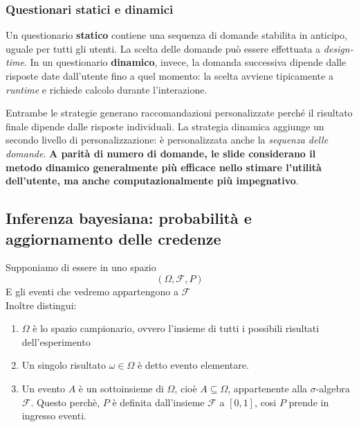 \subsubsection{Questionari statici e dinamici}
Un questionario \textbf{statico} contiene una sequenza di domande stabilita in anticipo, uguale per tutti gli utenti. La scelta delle domande può essere effettuata a \emph{design-time}. In un questionario \textbf{dinamico}, invece, la domanda successiva dipende dalle risposte date dall'utente fino a quel momento: la scelta avviene tipicamente a \emph{runtime} e richiede calcolo durante l'interazione.

Entrambe le strategie generano raccomandazioni personalizzate perché il risultato finale dipende dalle risposte individuali. La strategia dinamica aggiunge un secondo livello di personalizzazione: è personalizzata anche la \emph{sequenza delle domande}. \textbf{A parità di numero di domande, le slide considerano il metodo dinamico generalmente più efficace nello stimare l'utilità dell'utente, ma anche computazionalmente più impegnativo}.

\newpage

\subsection{Inferenza bayesiana: probabilità e aggiornamento delle credenze}
Supponiamo di essere in uno spazio 
\[
(\Omega,\mathcal{F},P)
\]
E gli eventi che vedremo appartengono a $\mathcal{F}$ \\
Inoltre distingui:
\begin{enumerate}
    \item \(\Omega\) è lo spazio campionario, ovvero l'insieme di tutti i possibili risultati dell'esperimento
    \item Un singolo risultato \(\omega \in \Omega\) è detto evento elementare.
    \item Un evento \(A\) è un sottoinsieme di \(\Omega\), cioè \(A \subseteq \Omega\), appartenente alla \(\sigma\)-algebra \(\mathcal{F}\).
    Questo perchè, $P$ è definita dall'insieme $\mathcal{F}$ a $[0,1]$, cosi $P$ prende in ingresso eventi.
\end{enumerate}
